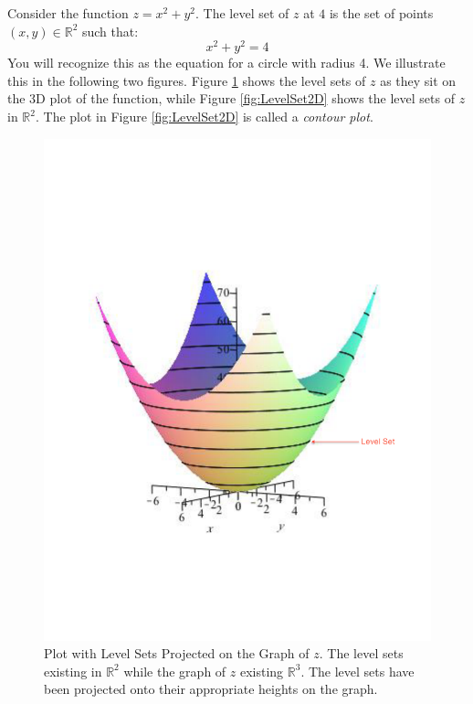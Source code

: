 \begin{example} Consider the function $z = x^2 + y^2$. The level set of $z$ at $4$ is the set of points $(x,y) \in \mathbb{R}^2$ such that:
\begin{equation}
x^2 + y^2 = 4
\end{equation}
You will recognize this as the equation for a circle with radius 4. We illustrate this in the following two figures. Figure \ref{fig:LevelSet3D} shows the level sets of $z$ as they sit on the 3D plot of the function, while Figure \ref{fig:LevelSet2D} shows the level sets of $z$ in $\mathbb{R}^2$. The plot in Figure \ref{fig:LevelSet2D} is called a \textit{contour plot}. 
\begin{figure}[ht]
\centering
\includegraphics[scale=0.25]{LevelSetPlotNote.pdf}
\caption{Plot with Level Sets Projected on the Graph of $z$. The level sets existing in $\mathbb{R}^2$ while the graph of $z$ existing $\mathbb{R}^3$. The level sets have been projected onto their appropriate heights on the graph.}
\label{fig:LevelSet3D}

\end{figure}
\end{example}
